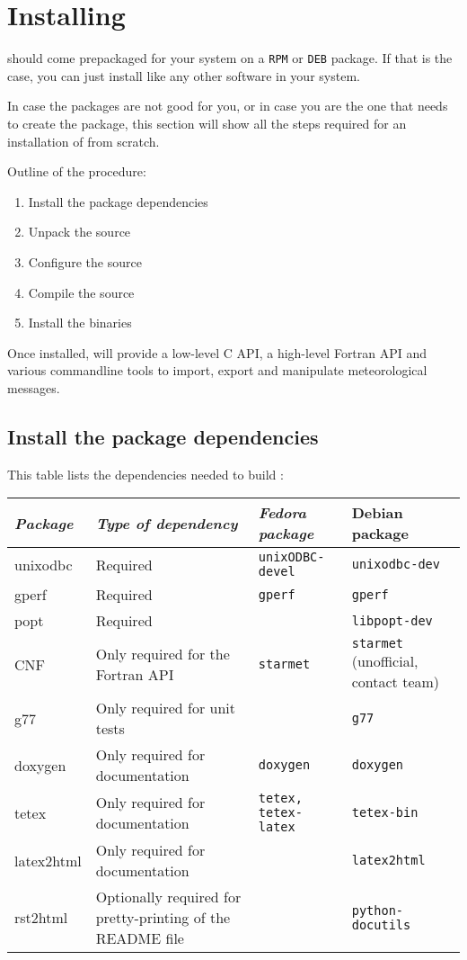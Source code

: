 \section {Installing \dballe{} }

\dballe{} should come prepackaged for your system on a {\tt RPM} or {\tt DEB}
package.  If that is the case, you can just install \dballe{} like any other
software in your system.

In case the packages are not good for you, or in case you are the one that
needs to create the package, this section will show all the steps required for
an installation of \dballe{} from scratch.

Outline of the procedure:

\begin{enumerate}
\item Install the package dependencies
\item Unpack the source
\item Configure the source
\item Compile the source
\item Install the binaries
\end{enumerate}

Once installed, \dballe{} will provide a low-level C API, a high-level Fortran
API and various commandline tools to import, export and manipulate
meteorological messages.

\subsection{Install the package dependencies}

This table lists the dependencies needed to build \dballe{}:

\begin{tabular}{|l|l|l|l|}
\hline
{\em Package} & {\em Type of dependency} & {\em Fedora package} & {\rm Debian package} \\
\hline
unixodbc   & Required                        & {\tt unixODBC-devel} & {\tt unixodbc-dev} \\
gperf      & Required                        & {\tt gperf} & {\tt gperf} \\
popt       & Required                        & {\tt } & {\tt libpopt-dev} \\
CNF        & Only required for the Fortran API & {\tt starmet} & {\tt starmet} (unofficial, contact \dballe{} team) \\
g77        & Only required for unit tests    & {\tt } & {\tt g77} \\
doxygen	   & Only required for documentation & {\tt doxygen} & {\tt doxygen} \\
tetex      & Only required for documentation & {\tt tetex, tetex-latex} & {\tt tetex-bin} \\
latex2html & Only required for documentation & {\tt } & {\tt latex2html} \\
rst2html   & Optionally required for pretty-printing of the README file & {\tt } & {\tt python-docutils} \\
\end{tabular}

